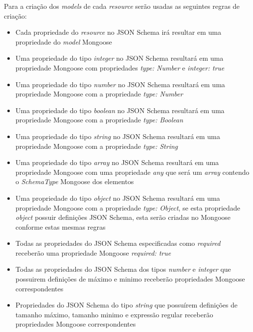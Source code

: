 \label{sec:bnf:mongo}

Para a criação dos \textit{models} de cada \textit{resource} serão usadas as seguintes regras de criação:
\begin{itemize}
    \item Cada propriedade do \textit{resource} no JSON Schema irá resultar em uma propriedade do \textit{model} Mongoose

    \item Uma propriedade do tipo \textit{integer} no JSON Schema resultará em uma propriedade Mongoose com propriedades \textit{type: Number} e \textit{integer: true}

    \item Uma propriedade do tipo \textit{number} no JSON Schema resultará em uma propriedade Mongoose com a propriedade \textit{type: Number}

    \item Uma propriedade do tipo \textit{boolean} no JSON Schema resultará em uma propriedade Mongoose com a propriedade \textit{type: Boolean}

    \item Uma propriedade do tipo \textit{string} no JSON Schema resultará em uma propriedade Mongoose com a propriedade \textit{type: String}

    \item Uma propriedade do tipo \textit{array} no JSON Schema resultará em uma propriedade Mongoose com uma propriedade \textit{any} que será um \textit{array} contendo o \textit{SchemaType} Mongoose dos elementos

    \item Uma propriedade do tipo \textit{object} no JSON Schema resultará em uma propriedade Mongoose com a propriedade \textit{type: Object}, se esta propriedade \textit{object} possuir definições JSON Schema, esta serão criadas no Mongoose conforme estas mesmas regras

    \item Todas as propriedades do JSON Schema especificadas como \textit{required} receberão uma propriedade Mongoose \textit{required: true}

    \item Todas as propriedades do JSON Schema dos tipos \textit{number} e \textit{integer} que possuirem definições de máximo e minimo receberão propriedades Mongoose correspondentes

    \item Propriedades do JSON Schema do tipo \textit{string} que possuírem definições de tamanho máximo, tamanho minimo e expressão regular receberão propriedades Mongoose correspondentes

\end{itemize}

